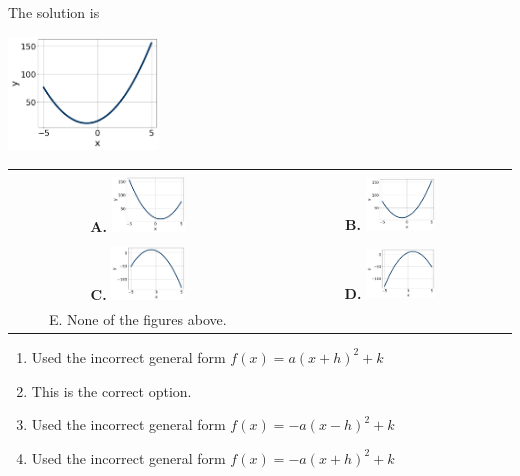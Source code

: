 \documentclass{extbook}[14pt]
\begin{document}
 
 The solution is  
 \begin{center} \includegraphics[width=0.3\textwidth]{../Figures/quadraticEquationToGraphBB.png} \end{center}\begin{tabular}{|c|c|} 
\hline 
 & \tabularnewline 
 \textbf{A.} \includegraphics[width=0.3\textwidth]{../Figures/quadraticEquationToGraphAB.png} & \textbf{B.} \includegraphics[width=0.3\textwidth]{../Figures/quadraticEquationToGraphBB.png} \tabularnewline 
\hline 
 & \tabularnewline 
 \textbf{C.} \includegraphics[width=0.3\textwidth]{../Figures/quadraticEquationToGraphCB.png} & \textbf{D.} \includegraphics[width=0.3\textwidth]{../Figures/quadraticEquationToGraphDB.png} \tabularnewline 
\hline 
 E. None of the figures above. & \tabularnewline 
\hline 
 \end{tabular} 
 
\begin{enumerate}[label=\Alph*.] 
\item Used the incorrect general form $f(x) = a(x+h)^2 + k$  
\item This is the correct option.  
\item Used the incorrect general form $f(x) = -a(x-h)^2 + k$  
\item Used the incorrect general form $f(x) = -a(x+h)^2 + k$  
\end{enumerate} 
 
\end{document}
